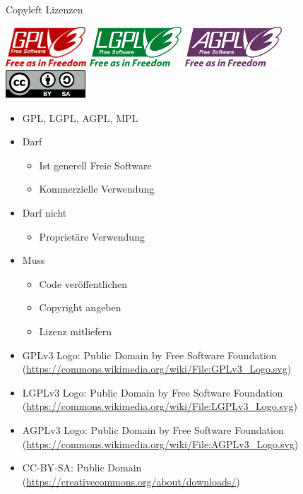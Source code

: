 {\begin{frame}{Copyleft Lizenzen}
	\begin{center}
		\includegraphics[height=1.5cm]{res/gpl-v3-logo.pdf}
		\hfill
		\includegraphics[height=1.5cm]{res/lgpl-v3-logo.pdf}
		\hfill
		\includegraphics[height=1.5cm]{res/agpl-v3-logo.pdf}
		\\
		\vspace{1cm}
		\includegraphics[width=3cm]{res/cc-by-sa.pdf}
	\end{center}
\end{frame}
\note
{
	\begin{itemize}
		\item GPL, LGPL, AGPL, MPL
		\item Darf
		\begin{itemize}
			\item Ist generell Freie Software
			\item Kommerzielle Verwendung
		\end{itemize}
		\item Darf nicht
		\begin{itemize}
			\item Proprietäre Verwendung
		\end{itemize}
		\item Muss
		\begin{itemize}
			\item Code veröffentlichen
			\item Copyright angeben
			\item Lizenz mitliefern
		\end{itemize}
	\end{itemize}
	\begin{itemize}
		\item GPLv3 Logo: Public Domain by Free Software Foundation (\url{https://commons.wikimedia.org/wiki/File:GPLv3\_Logo.svg})
		\item LGPLv3 Logo: Public Domain by Free Software Foundation (\url{https://commons.wikimedia.org/wiki/File:LGPLv3\_Logo.svg})
		\item AGPLv3 Logo: Public Domain by Free Software Foundation (\url{https://commons.wikimedia.org/wiki/File:AGPLv3\_Logo.svg})
		\item CC-BY-SA: Public Domain (\url{https://creativecommons.org/about/downloads/})
	\end{itemize}
}

}
